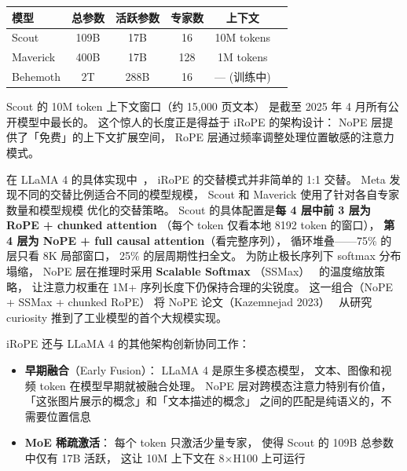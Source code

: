 \begin{center}\small
\renewcommand{\arraystretch}{1.3}
\begin{tabular}{lccccc}
\toprule
\rowcolor{figLightGray}
\textbf{模型} & \textbf{总参数} & \textbf{活跃参数} & \textbf{专家数} & \textbf{上下文} \\
\midrule
Scout   & 109B  & 17B  & 16    & 10M tokens \\
Maverick & 400B & 17B  & 128   & 1M tokens \\
Behemoth & 2T   & 288B & 16    & --- (训练中) \\
\bottomrule
\end{tabular}
\end{center}

Scout 的 10M token 上下文窗口（约 15,000 页文本）
是截至 2025 年 4 月所有公开模型中最长的。
这个惊人的长度正是得益于 iRoPE 的架构设计：
NoPE 层提供了「免费」的上下文扩展空间，
RoPE 层通过频率调整处理位置敏感的注意力模式。

在 LLaMA 4 的具体实现中~\cite{meta2025llama4,llama4irope2026}，
iRoPE 的交替模式并非简单的 1:1 交替。
Meta 发现不同的交替比例适合不同的模型规模，
Scout 和 Maverick 使用了针对各自专家数量和模型规模
优化的交替策略。
Scout 的具体配置是\textbf{每 4 层中前 3 层为 RoPE + chunked attention}
（每个 token 仅看本地 8192 token 的窗口），
\textbf{第 4 层为 NoPE + full causal attention}（看完整序列），
循环堆叠——75\% 的层只看 8K 局部窗口，
25\% 的层周期性扫全文。
为防止极长序列下 softmax 分布塌缩，
NoPE 层在推理时采用 \textbf{Scalable Softmax}
（SSMax）~\cite{nakanishi2025ssmax} 的温度缩放策略，
让注意力权重在 1M+ 序列长度下仍保持合理的尖锐度。
这一组合（NoPE + SSMax + chunked RoPE）
将 NoPE 论文（Kazemnejad 2023）~\cite{kazemnejad2023nope}
从研究 curiosity 推到了工业模型的首个大规模实现。

iRoPE 还与 LLaMA 4 的其他架构创新协同工作：
\begin{itemize}[noitemsep]
  \item \textbf{早期融合}（Early Fusion）：
        LLaMA 4 是原生多模态模型，
        文本、图像和视频 token 在模型早期就被融合处理。
        NoPE 层对跨模态注意力特别有价值，
        「这张图片展示的概念」和「文本描述的概念」
        之间的匹配是纯语义的，不需要位置信息
  \item \textbf{MoE 稀疏激活}：
        每个 token 只激活少量专家，
        使得 Scout 的 109B 总参数中仅有 17B 活跃，
        这让 10M 上下文在 8$\times$H100 上可运行
\end{itemize}

